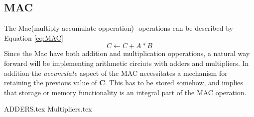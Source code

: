 \subsection{MAC}
The Mac(multiply-accumulate opperation)- operations can be described by Equation \ref{eq:MAC}
\begin{equation} \label{eq:MAC}
    C\leftarrow C+A*B
\end{equation}
Since the Mac have both addition and multiplication opperations, a natural way forward will be implementing arithmetic circiuts with adders and multipliers. In addition the \emph{accumulate} aspect of the MAC necessitates a mechanism for retaining the previous value of  \textbf{C}. This has to be stored somehow, and implies that storage or memory functionality is an integral part of the MAC operation.  


{ADDERS.tex}
{Multipliers.tex}